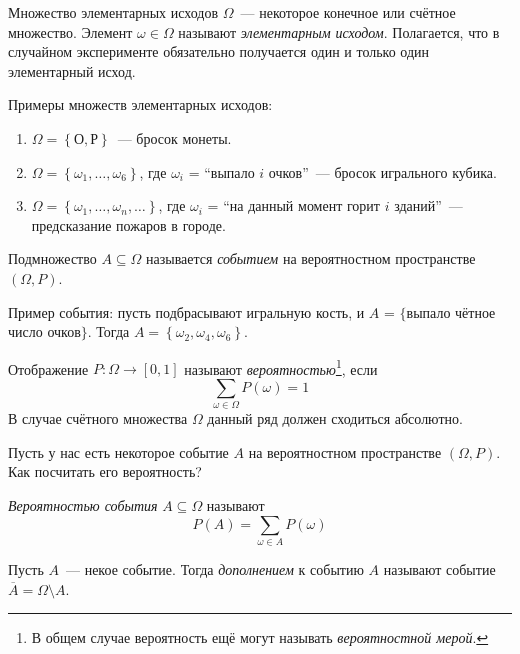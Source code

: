 \documentclass[a4paper,12pt]{article}
\begin{document}
Множество элементарных исходов \(\Omega\)~--- некоторое конечное или счётное множество. Элемент \(\omega \in \Omega\) называют \emph{элементарным исходом}. Полагается, что в случайном эксперименте обязательно получается один и только один элементарный исход.

Примеры множеств элементарных исходов:

\begin{enumerate}
    \item \(\Omega = \left\{\text{О}, \text{Р}\right\}\)~--- бросок монеты.
    
    \item \(\Omega = \left\{\omega_1, \ldots, \omega_6\right\}\), где \(\omega_i\) = ``выпало \(i\) очков''~--- бросок игрального кубика.
    
    \item \(\Omega = \left\{\omega_1, \ldots, \omega_n, \ldots \right\}\), где \(\omega_i\) = ``на данный момент горит \(i\) зданий''~---  предсказание пожаров в городе.
\end{enumerate}

\begin{definition}
Подмножество \(A \subseteq \Omega\) называется \emph{событием} на вероятностном пространстве \((\Omega, P)\).
\end{definition}

Пример события: пусть подбрасывают игральную кость, и \(A\) = \(\{\)выпало чётное число очков\(\}\). Тогда \(A = \left\{\omega_2, \omega_4, \omega_6 \right\}\).

\begin{definition}
Отображение \(P : \Omega \to [0, 1]\) называют \emph{вероятностью}\footnote{В общем случае вероятность ещё могут называть \emph{вероятностной мерой}.}, если \[\sum_{\omega \in \Omega} P(\omega) = 1\]
В случае счётного множества \(\Omega\) данный ряд должен сходиться абсолютно.
\end{definition}

Пусть у нас есть некоторое событие \(A\) на вероятностном пространстве \((\Omega, P)\). Как посчитать его вероятность?

\begin{definition}
\emph{Вероятностью события} \(A \subseteq \Omega\) называют
\[P(A) = \sum_{\omega \in A} P(\omega)\]
\end{definition}

\begin{definition}
Пусть \(A\)~--- некое событие. Тогда \emph{дополнением} к событию \(A\) называют событие \(\overline{A} = \Omega \setminus A\).
\end{definition}
\end{document}
